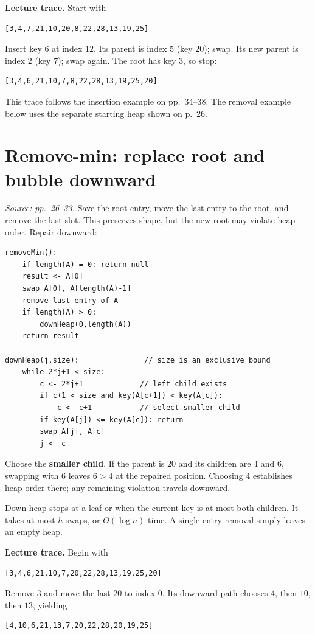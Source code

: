 \documentclass[11pt]{article}
\begin{document}
\textbf{Lecture trace.} Start with
\begin{lstlisting}
[3,4,7,21,10,20,8,22,28,13,19,25]
\end{lstlisting}
Insert key $6$ at index $12$. Its parent is index $5$ (key $20$); swap. Its new parent is index $2$ (key $7$); swap again. The root has key $3$, so stop:
\begin{lstlisting}
[3,4,6,21,10,7,8,22,28,13,19,25,20]
\end{lstlisting}
This trace follows the insertion example on pp.\ 34--38. The removal example below uses the separate starting heap shown on p.\ 26.

\section{Remove-min: replace root and bubble downward}
\textit{Source: pp.\ 26--33.}
Save the root entry, move the last entry to the root, and remove the last slot. This preserves shape, but the new root may violate heap order. Repair downward:
\begin{lstlisting}
removeMin():
    if length(A) = 0: return null
    result <- A[0]
    swap A[0], A[length(A)-1]
    remove last entry of A
    if length(A) > 0:
        downHeap(0,length(A))
    return result

downHeap(j,size):               // size is an exclusive bound
    while 2*j+1 < size:
        c <- 2*j+1             // left child exists
        if c+1 < size and key(A[c+1]) < key(A[c]):
            c <- c+1           // select smaller child
        if key(A[j]) <= key(A[c]): return
        swap A[j], A[c]
        j <- c
\end{lstlisting}
Choose the \textbf{smaller child}. If the parent is $20$ and its children are $4$ and $6$, swapping with $6$ leaves $6>4$ at the repaired position. Choosing $4$ establishes heap order there; any remaining violation travels downward.

Down-heap stops at a leaf or when the current key is at most both children. It takes at most $h$ swaps, or $O(\log n)$ time. A single-entry removal simply leaves an empty heap.

\textbf{Lecture trace.} Begin with
\begin{lstlisting}
[3,4,6,21,10,7,20,22,28,13,19,25,20]
\end{lstlisting}
Remove $3$ and move the last $20$ to index $0$. Its downward path chooses $4$, then $10$, then $13$, yielding
\begin{lstlisting}
[4,10,6,21,13,7,20,22,28,20,19,25]
\end{lstlisting}
\end{document}
